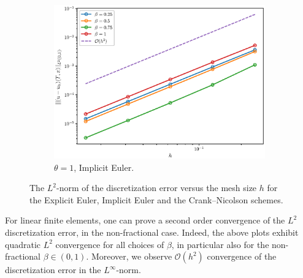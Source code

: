 \begin{figure}[h]
\begin{subfigure}{0.5\textwidth}
  \includegraphics[width=\linewidth]{figures/theta1/l2.eps}
  \caption{$\theta = 1$, Implicit Euler.}
  \label{fig:sub2}
\end{subfigure}
\caption{The $L^2$-norm of the discretization error versus the mesh size $h$ for the Explicit Euler, Implicit Euler and the Crank--Nicolson schemes. }
\label{fig:sub2}
\end{figure}
\newpage
For linear finite elements, one can prove a second order convergence of the $L^2$ discretization error\cite{schwab}, in the non-fractional case. Indeed, the above plots exhibit quadratic $L^2$ convergence for all choices of $\beta$, in particular also for the non-fractional $\beta\in(0,1)$.  Moreover, we observe $\mathcal{O}(h^2)$ convergence of the discretization error in the $L^{\infty}$-norm.
